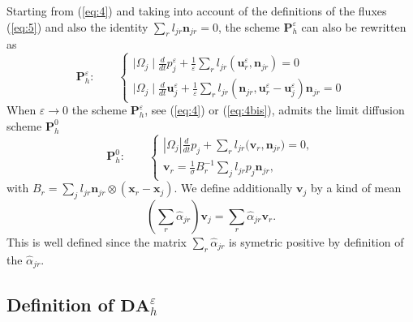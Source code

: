 \documentclass[a4paper,french,english,10pt]{article}
\newcommand\njr{\mathbf{n}_{jr}}
\newcommand\uu{\mathbf{u}}
\newcommand\vv{\mathbf{v}}
\newcommand\eps{\varepsilon}
\newcommand\alj{\widehat{\alpha}_{jr}}
\newcommand\xj{\mathbf{x}_j}
\newcommand\xr{\mathbf{x}_r}
\newcommand\uj{\uu_j}
\newcommand\ur{\uu_r}
\begin{document}
Starting from (\ref{eq:4}) and taking into account of the definitions of
the fluxes (\ref{eq:5}) and also the identity $\sum_r l_{jr} \njr=0$,
the scheme $\mathbf P_h^\eps$ can also be rewritten as
\begin{equation}\label{eq:4bis}
\mathbf P_h^\eps:
\qquad
\left\{ 
\begin{array}{l}
\displaystyle \mid\Omega_{j}\mid\frac{d}{dt} p_{j}^{\eps}+\frac{1}{\varepsilon}
\sum_{r} l_{jr}(\ur^{\eps},\njr)=0\\
\displaystyle \mid
\Omega_{j}\mid\frac{d}{dt}\uj^{\eps}+\frac{1}{\varepsilon}
\sum_{r}l_{jr} (\njr,\uu_r^{\eps} -\uu_j^{\eps})\njr=0
\end{array}
\right.
\end{equation}
When $\eps \rightarrow 0$
the scheme $\mathbf P_h^\eps$, see (\ref{eq:4}) or (\ref{eq:4bis}), admits the limit diffusion scheme 
$\mathbf P_h^0$ 
\begin{equation}\label{diffglace}
\mathbf P_h^0:
\qquad\left\{ \begin{array}{l}
\displaystyle \left| \Omega_j 
\right| \frac{d}{dt} p_j+ 
\sum_{r} l_{jr}\bigg( 
\vv_r,\njr\bigg)=0,\\
\displaystyle \vv_r=\frac{1}{\sigma} B_r^{-1}
\sum_{j}l_{jr}p_j\njr,
\end{array}\right.
\end{equation}
with $B_r=\sum_{j}l_{jr}\njr\otimes(\xr-\xj)$.
We  define additionally $\vv_j$ by a kind of mean
$$
\left( \sum_r \alj \right) \vv_j=\sum_r \alj
\vv_r.
$$
This is well defined since the matrix
$\sum_r \alj$ is  symetric positive by definition of the $\alj$.




\subsection{Definition of $\mathbf{DA}_h^\eps$}
\end{document}
